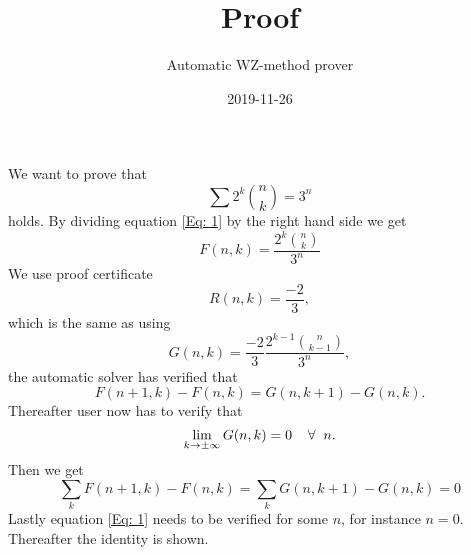 \documentclass{article}
\title{Proof}
\author{Automatic WZ-method prover}
\date{2019-11-26}
\let\oldforall\forall
\renewcommand{\forall}{\hspace*{2mm}\oldforall\hspace*{1mm}}
\begin{document}
\maketitle
We want to prove that
\begin{equation}\label{Eq: 1}
\sum 2^k\binom{n}{k} = 3^n
\end{equation}
holds. By dividing equation \ref{Eq: 1} by the right hand side we get
\begin{equation}
F(n,k)=\frac{2^{k}\binom{n}{k}}{3^{n}}
\end{equation}
We use proof certificate
\begin{equation}
R(n,k)=\frac{-2}{3},
\end{equation}
which is the same as using
\begin{equation}
G(n,k)=\frac{-2}{3}\frac{2^{k-1}\binom{n}{k-1}}{3^{n}},
\end{equation}
the automatic solver has  verified that
\begin{equation}\label{Eq: WZ1}
F(n+1,k)-F(n,k)=G(n,k+1)-G(n,k).
\end{equation}
Thereafter user now has to verify that
\begin{equation}
\lim_{k\to\pm\infty}G(n,k)=0\forall n.
\end{equation}
Then we get
\begin{equation}
\sum_k F(n+1,k)-F(n,k)=\sum_k G(n,k+1)-G(n,k)=0\end{equation}Lastly equation \ref{Eq: 1} needs to be verified for some $n$, for instance $n=0$. Thereafter the identity is shown.
\end{document}
